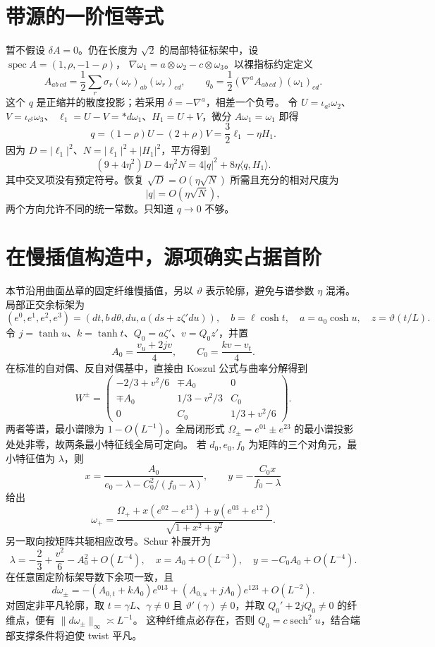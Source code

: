 \documentclass[UTF8,fontset=fandol,zihao=-4,oneside,openany]{ctexbook}
\theoremstyle{cjkplain}
\numberwithin{equation}{chapter}
\begin{document}
\section{带源的一阶恒等式}
暂不假设 $\delta A=0$。仍在长度为 $\sqrt2$ 的局部特征标架中，设
$\operatorname{spec}A=(1,\rho,-1-\rho)$，
$\nabla\omega_1=a\otimes\omega_2-c\otimes\omega_3$。以裸指标约定定义
\[
A_{ab\,cd}=\frac12\sum_r\sigma_r(\omega_r)_{ab}(\omega_r)_{cd},\qquad
q_b=\frac12(\nabla^aA_{ab\,cd})(\omega_1)_{cd}.
\]
这个 $q$ 是正缩并的散度投影；若采用 $\delta=-\nabla^a$，相差一个负号。
令
$U=\iota_{a^\sharp}\omega_2$、$V=\iota_{c^\sharp}\omega_3$、
$\ell_1=U-V=*d\omega_1$、$H_1=U+V$，微分 $A\omega_1=\omega_1$ 即得
\begin{equation}\label{WYL:source}
q=(1-\rho)U-(2+\rho)V=\frac32\ell_1-\eta H_1.
\end{equation}
因为 $D=|\ell_1|^2$、$N=|\ell_1|^2+|H_1|^2$，平方得到
\begin{equation}\label{WYL:sourceenergy}
(9+4\eta^2)D-4\eta^2N
=4|q|^2+8\eta\langle q,H_1\rangle.
\end{equation}
其中交叉项没有预定符号。恢复 $\sqrt D=O(\eta\sqrt N)$ 所需且充分的相对尺度为
\[
|q|=O(\eta\sqrt N),
\]
两个方向允许不同的统一常数。只知道 $q\to0$ 不够。

\section{在慢插值构造中，源项确实占据首阶}
本节沿用曲面丛章的固定纤维慢插值，另以 $\vartheta$ 表示轮廓，避免与谱参数 $\eta$ 混淆。局部正交余标架为
\[
(e^0,e^1,e^2,e^3)=(dt,b\,d\theta,du,a(ds+z\zeta' du)),
\quad b=\ell\cosh t,\quad a=a_0\cosh u,\quad z=\vartheta(t/L).
\]
令 $j=\tanh u$、$k=\tanh t$、$Q_0=a\zeta'$、$v=Q_0z'$，并置
\[
A_0=\frac{v_u+2jv}{4},\qquad C_0=\frac{kv-v_t}{4}.
\]
在标准的自对偶、反自对偶基中，直接由 Koszul 公式与曲率分解得到
\begin{equation}\label{WYL:explicitmatrix}
W^\pm=\begin{pmatrix}
-2/3+v^2/6&\mp A_0&0\\
\mp A_0&1/3-v^2/3&C_0\\
0&C_0&1/3+v^2/6
\end{pmatrix}.
\end{equation}
两者等谱，最小谱隙为 $1-O(L^{-1})$。全局闭形式
$\Omega_\pm=e^{01}\pm e^{23}$ 的最小谱投影处处非零，故两条最小特征线全局可定向。
若 $d_0,e_0,f_0$ 为矩阵的三个对角元，最小特征值为 $\lambda$，则
\[
x=\frac{A_0}{e_0-\lambda-C_0^2/(f_0-\lambda)},\qquad
y=-\frac{C_0x}{f_0-\lambda}
\]
给出
\[
\omega_+=\frac{\Omega_++x(e^{02}-e^{13})+y(e^{03}+e^{12})}{\sqrt{1+x^2+y^2}}.
\]
另一取向按矩阵共轭相应改号。Schur 补展开为
\[
\lambda=-\frac23+\frac{v^2}{6}-A_0^2+O(L^{-4}),\quad
x=A_0+O(L^{-3}),\quad y=-C_0A_0+O(L^{-4}).
\]
在任意固定阶标架导数下余项一致，且
\begin{equation}\label{WYL:nonclosed}
d\omega_\pm=-(A_{0,t}+kA_0)e^{013}
+(A_{0,u}+jA_0)e^{123}+O(L^{-2}).
\end{equation}
对固定非平凡轮廓，取 $t=\gamma L$、$\gamma\ne0$ 且 $\vartheta'(\gamma)\ne0$，并取
$Q_0'+2jQ_0\ne0$ 的纤维点，便有
$\|d\omega_\pm\|_\infty\asymp L^{-1}$。
这种纤维点必存在，否则 $Q_0=c\operatorname{sech}^2u$，结合端部支撑条件将迫使 twist 平凡。
\end{document}
